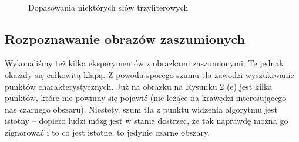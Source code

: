 \documentclass[a4paper,12pt,leqno]{article}
\begin{document}
\begin{figure}\centering
{}\\
\hspace{5mm}
\caption{Dopasowania niektórych słów trzyliterowych}
\end{figure}

\subsection{Rozpoznawanie obrazów zaszumionych}
Wykonaliśmy też kilka eksperymentów z obrazkami zaszumionymi. Te jednak okazały się całkowitą klapą. Z powodu sporego szumu tła zawodzi wyszukiwanie punktów charakterystycznych.
Już na obrazku na Rysunku 2 (e) jest kilka punktów, które nie powinny się pojawić (nie leżące na krawędzi interesującego nas czarnego obszaru). 
Niestety, szum tła z punktu widzenia algorytmu jest istotny -- dopiero ludzi mózg jest w stanie dostrzec, że tak naprawdę można go zignorować i to co jest istotne, to jedynie czarne obszary.
\end{document}
